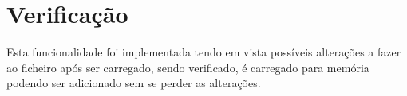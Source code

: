 \section{Verificação}

Esta funcionalidade foi implementada tendo em vista possíveis alterações a fazer ao ficheiro após ser carregado, sendo verificado, é carregado para memória podendo ser adicionado sem se perder as alterações.